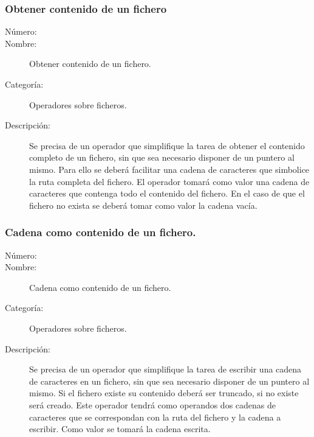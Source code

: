 \subsubsection{Obtener contenido de un fichero}
	\begin{description}
		\item [Número:] \cn
		\item [Nombre:] Obtener contenido de un fichero.
		\item [Categoría:] Operadores sobre ficheros.
		\item [Descripción:] Se precisa de un operador que simplifique la tarea de obtener el contenido completo de un fichero, sin que sea necesario disponer de un 
		puntero al mismo. Para ello se deberá facilitar una cadena de caracteres que simbolice la ruta completa del fichero. El operador tomará como valor
		una cadena de caracteres que contenga todo el contenido del fichero. En el caso de que el fichero no exista se deberá tomar como valor la cadena vacía.
	\end{description}

\subsubsection{Cadena como contenido de un fichero.}
	\begin{description}
		\item [Número:] \cn
		\item [Nombre:] Cadena como contenido de un fichero.
		\item [Categoría:] Operadores sobre ficheros.
		\item [Descripción:] Se precisa de un operador que simplifique la tarea de escribir una cadena de caracteres en un fichero, sin que sea necesario 
		disponer de un puntero al mismo. Si el fichero existe su contenido deberá ser truncado, si no existe será creado. Este operador tendrá como operandos dos cadenas 
		de caracteres que se correspondan con la ruta del fichero y la cadena a escribir. Como valor se tomará la cadena escrita.
	\end{description}

